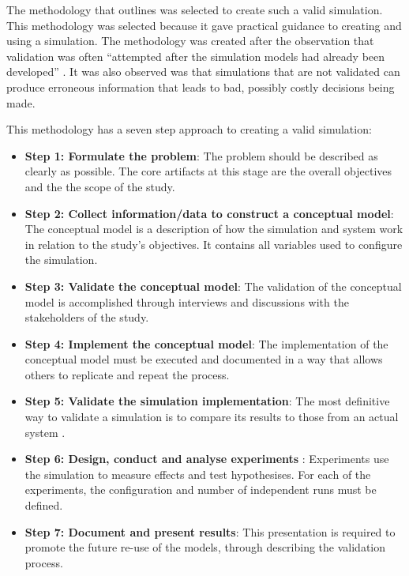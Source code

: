 The methodology that \cite{Law2005} outlines was selected to create such a valid simulation.
This methodology was selected because it gave practical guidance to creating and using a simulation.
The methodology was created after the observation that validation was often ``attempted after the simulation models had already been developed'' \citep{Law2005}.
It was also observed was that simulations that are not validated can produce erroneous information that leads to bad, possibly costly decisions being made.

This methodology has a seven step approach to creating a valid simulation:
\begin{itemize}
  \item \textbf{Step 1: Formulate the problem}: %
	The problem should be described as clearly as possible.
	The core artifacts at this stage are the overall objectives and the the scope of the study.
\item \textbf{Step 2: Collect information/data to construct a conceptual model}: %
	The conceptual model is a description of how the simulation and system work in relation to the study's objectives.
	It contains all variables used to configure the simulation. 
\item \textbf{Step 3: Validate the conceptual model}: %
	The validation of the conceptual model is accomplished through interviews and discussions with the stakeholders of the study.
\item \textbf {Step 4: Implement the conceptual model}: %
	The implementation of the conceptual model must be executed and documented in a way that allows others to replicate and repeat the process.
\item \textbf{Step 5: Validate the simulation implementation}: %
	The most definitive way to validate a simulation is to compare its results to those from an actual system \citep{Law2005}.
\item \textbf{Step 6: Design, conduct and analyse experiments} :
	Experiments use the simulation to measure effects and test hypothesises. 
	For each of the experiments, the configuration and number of independent runs must be defined.
\item \textbf{Step 7: Document and present results}:
	This presentation is required to promote the future re-use of the models, through describing the validation process.
\end{itemize}

